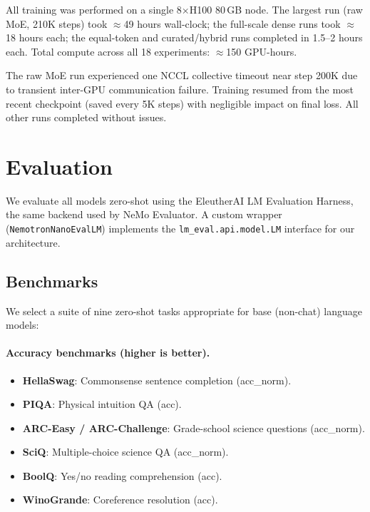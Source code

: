 \documentclass[10pt]{article}
\begin{document}
All training was performed on a single 8$\times$H100 80\,GB node. The largest run (raw MoE, 210K steps) took ${\approx}$49 hours wall-clock; the full-scale dense runs took ${\approx}$18 hours each; the equal-token and curated/hybrid runs completed in 1.5--2 hours each. Total compute across all 18 experiments: ${\approx}$150 GPU-hours.

The raw MoE run experienced one NCCL collective timeout near step 200K due to transient inter-GPU communication failure. Training resumed from the most recent checkpoint (saved every 5K steps) with negligible impact on final loss. All other runs completed without issues.

\section{Evaluation}
\label{sec:evaluation}

We evaluate all models zero-shot using the EleutherAI LM Evaluation Harness, the same backend used by NeMo Evaluator.
A custom wrapper (\texttt{NemotronNanoEvalLM}) implements the \texttt{lm\_eval.api.model.LM} interface for our architecture.

\subsection{Benchmarks}

We select a suite of nine zero-shot tasks appropriate for base (non-chat) language models:

\paragraph{Accuracy benchmarks (higher is better).}
\begin{itemize}
    \item \textbf{HellaSwag}: Commonsense sentence completion (acc\_norm).
    \item \textbf{PIQA}: Physical intuition QA (acc).
    \item \textbf{ARC-Easy / ARC-Challenge}: Grade-school science questions (acc\_norm).
    \item \textbf{SciQ}: Multiple-choice science QA (acc\_norm).
    \item \textbf{BoolQ}: Yes/no reading comprehension (acc).
    \item \textbf{WinoGrande}: Coreference resolution (acc).
\end{itemize}
\end{document}
